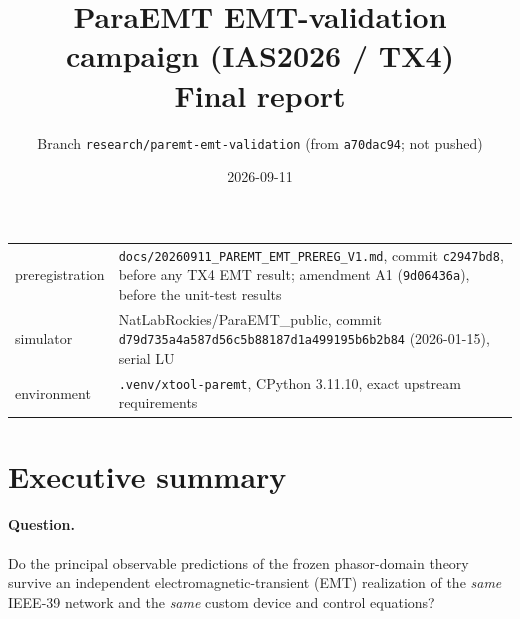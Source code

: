 \documentclass[10pt,a4paper]{article}
\title{\textbf{ParaEMT EMT-validation campaign (IAS2026 / TX4)}\\[3pt]\large Final report}
\author{Branch \texttt{research/paremt-emt-validation} (from \texttt{a70dac94}; not pushed)}
\date{2026-09-11}
\newcommand{\f}[1]{\nolinkurl{#1}}
\begin{document}
\maketitle

\begin{center}
\end{center}

\medskip
\noindent\begin{tabularx}{\linewidth}{@{}L{3.2cm}Y@{}}
\toprule
preregistration & \f{docs/20260911_PAREMT_EMT_PREREG_V1.md}, commit \texttt{c2947bd8}, before any TX4 EMT result; amendment A1 (\texttt{9d06436a}), before the unit-test results\\
simulator & NatLabRockies/ParaEMT\_public, commit \texttt{d79d735a4a587d56c5b88187d1a499195b6b2b84} (2026-01-15), serial LU\\
environment & \f{.venv/xtool-paremt}, CPython 3.11.10, exact upstream requirements\\
\bottomrule
\end{tabularx}

\tableofcontents

\section{Executive summary}

\paragraph{Question.} Do the principal observable predictions of the frozen
phasor-domain theory survive an independent electromagnetic-transient (EMT)
realization of the \emph{same} IEEE-39 network and the \emph{same} custom
device and control equations?
\end{document}
